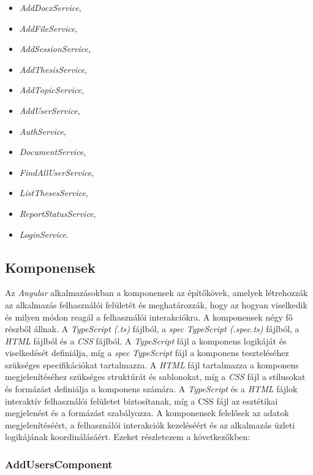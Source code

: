 \begin{itemize}

\item{\textit{AddDocxService}},
\item{\textit{AddFileService}},
\item{\textit{AddSessionService}},
\item{\textit{AddThesisService}},
\item{\textit{AddTopicService}},
\item{\textit{AddUserService}},
\item{\textit{AuthService}},
\item{\textit{DocumentService}},
\item{\textit{FindAllUserService}},
\item{\textit{ListThesesService}},
\item{\textit{ReportStatusService}},
\item{\textit{LoginService}}.

\end{itemize}

\subsection{Komponensek}

Az \textit{Angular} alkalmazásokban a komponensek az építőkövek, amelyek létrehozzák az alkalmazás felhasználói felületét és meghatározzák, hogy az hogyan viselkedik és milyen módon reagál a felhasználói interakciókra. A komponensek négy fő részből állnak. A \textit{TypeScript (.ts)} fájlból, a \textit{spec} \textit{TypeScript (.spec.ts)} fájlból, a \textit{HTML} fájlból és a \textit{CSS} fájlból. A \textit{TypeScript} fájl a komponens logikáját és viselkedését definiálja, míg a \textit{spec} \textit{TypeScript} fájl a komponens teszteléséhez szükséges specifikációkat tartalmazza. A \textit{HTML} fájl tartalmazza a komponens megjelenítéséhez szükséges struktúrát és sablonokat, míg a \textit{CSS} fájl a stílusokat és formázást definiálja a komponens számára. A \textit{TypeScript} és a \textit{HTML} fájlok interaktív felhasználói felületet biztosítanak, míg a CSS fájl az esztétikai megjelenést és a formázást szabályozza. A komponensek felelősek az adatok megjelenítéséért, a felhasználói interakciók kezeléséért és az alkalmazás üzleti logikájának koordinálásáért. Ezeket részletezem a következőkben:

\subsubsection{AddUsersComponent}

